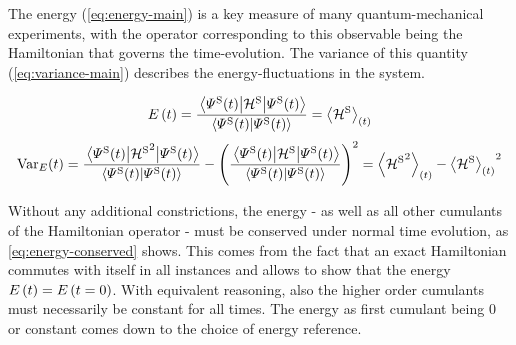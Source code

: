 The energy \energyOft (\autoref{eq:energy-main}) is a key measure of many quantum-mechanical experiments, with the operator corresponding to this observable being the Hamiltonian that governs the time-evolution.
The variance \varianceOft of this quantity (\autoref{eq:variance-main}) describes the energy-fluctuations in the system.

\begin{equation}
    \label{eq:energy-main}
    \energyOft = \frac{\bracketHelper{\psiOfT[\schroedingerPicture]}{\pictureHamiltonian[\schroedingerPicture]}{\psiOfT[\schroedingerPicture]}}{\braketHelper{\psiOfT[\schroedingerPicture]}{\psiOfT[\schroedingerPicture]}}
       = \timeExpectationVal{\pictureHamiltonian[\schroedingerPicture]}
\end{equation}
\begin{equation}
    \label{eq:variance-main}
    \varianceOft = \frac{\bracketHelper{\psiOfT[\schroedingerPicture]}{{\pictureHamiltonian[\schroedingerPicture]}^2}{\psiOfT[\schroedingerPicture]}}{\braketHelper{\psiOfT[\schroedingerPicture]}{\psiOfT[\schroedingerPicture]}}-\left(\frac{\bracketHelper{\psiOfT[\schroedingerPicture]}{\pictureHamiltonian[\schroedingerPicture]}{\psiOfT[\schroedingerPicture]}}{\braketHelper{\psiOfT[\schroedingerPicture]}{\psiOfT[\schroedingerPicture]}}\right)^2
       = \timeExpectationVal{{\pictureHamiltonian[\schroedingerPicture]}^2} - {\timeExpectationVal{\pictureHamiltonian[\schroedingerPicture]}}^2
\end{equation}

Without any additional constrictions, %
the energy - as well as all other cumulants of the Hamiltonian operator - must be conserved under normal time evolution, as \autoref{eq:energy-conserved} shows. 
This comes from the fact that an exact Hamiltonian commutes with itself in all instances and allows to show that the energy $\energyOft = \energyOft[t=0]$.
With equivalent reasoning, also the higher order cumulants must necessarily be constant for all times.
The energy as first cumulant %
being 0 or constant comes down to the choice of energy reference.

